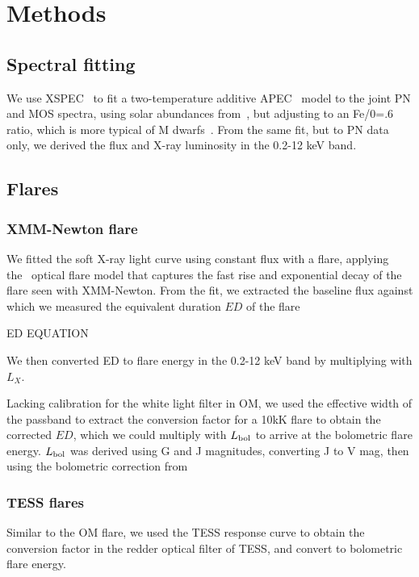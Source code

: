 \documentclass[twocolumn]{aastex631}
\begin{document}
\section{Methods}
\label{sec:methods}




\subsection{Spectral fitting}
We use XSPEC~\citep{arnaud1996xspec} to fit a two-temperature additive APEC~\citep{smith2001collisional,foster2012updated} model to the joint PN and MOS spectra, using solar abundances from~\citet{grevesse1998standard}, but adjusting to an Fe/0=.6 ratio, which is more typical of M dwarfs~\citep{wood2018chandra}. From the same fit, but to PN data only, we derived the flux and X-ray luminosity in the 0.2-12 keV band. 

\subsection{Flares}

\subsubsection{XMM-Newton flare}

We fitted the soft X-ray light curve using constant flux with a flare, applying the~\citet{davenport2014kepler} optical flare model that captures the fast rise and exponential decay of the flare seen with XMM-Newton. From the fit, we extracted the baseline flux against which we measured the equivalent duration $ED$ of the flare

ED EQUATION

We then converted ED to flare energy in the 0.2-12 keV band by multiplying with $L_X$. 

Lacking calibration for the white light filter in OM, we used the effective width of the passband to extract the conversion factor for a 10kK flare to obtain the corrected $ED$, which we could multiply with $L_{\rm bol}$ to arrive at the bolometric flare energy. $L_{\rm bol}$ was derived using G and J magnitudes, converting J to V mag, then using the bolometric correction from
\subsubsection{TESS flares}

Similar to the OM flare, we used the TESS response curve to obtain the conversion factor in the redder optical filter of TESS, and convert to bolometric flare energy.
\end{document}
